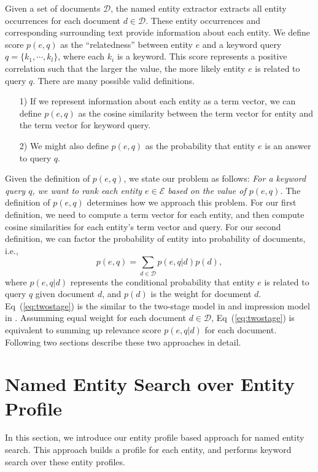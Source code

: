 \documentclass{sig-alternate}
\theoremstyle{definition}
\begin{document}
Given a set of documents $\mathcal{D}$, the named entity extractor extracts all entity occurrences for each document $d \in \mathcal{D}$. These entity occurrences and corresponding surrounding text provide information about each entity. We define score $p(e, q)$ as the ``relatedness'' between entity $e$ and a keyword query $q = \{k_1, \cdots, k_l\}$, where each $k_i$ is a keyword. This score represents a positive correlation such that the larger the value, the more likely entity $e$ is related to query $q$. There are many possible valid definitions.
\begin{itemize}
\item[1)] If we represent information about each entity as a term vector, we can define $p(e, q)$ as the cosine similarity between the term vector for entity and the term vector for keyword query.
\item[2)] We might also define $p(e, q)$ as the probability that entity $e$ is an answer to query $q$.
\end{itemize}
Given the definition of $p(e, q)$, we state our problem as follows:
\vskip 2mm
\textit{For a keyword query $q$, we want to rank each entity $e \in \mathcal{E}$ based on the value of $p(e, q)$.}
\vskip 2mm
The definition of $p(e, q)$ determines how we approach this problem. For our first definition, we need to compute a term vector for each entity, and then compute cosine similarities for each entity's term vector and query. For our second definition, we can factor the probability of entity into probability of documents, i.e.,
\begin{equation}\label{eq:twostage}
p(e, q) = \sum_{d \in \mathcal{D}} p(e, q | d) p(d),
\end{equation}
where $p(e, q | d)$ represents the conditional probability that entity $e$ is related to query $q$ given document $d$, and $p(d)$ is the weight for document $d$. Eq~(\ref{eq:twostage}) is the similar to the two-stage model in \cite{cao2005research} and impression model in \cite{cheng2007entityrank}. Assumming equal weight for each document $d \in \mathcal{D}$, Eq~(\ref{eq:twostage}) is equivalent to summing up relevance score $p(e, q | d)$ for each document. Following two sections describe these two approaches in detail.

\section{Named Entity Search over Entity Profile}\label{sec:profile}
In this section, we introduce our entity profile based approach for named entity search. This approach builds a profile for each entity, and performs keyword search over these entity profiles.
\end{document}
